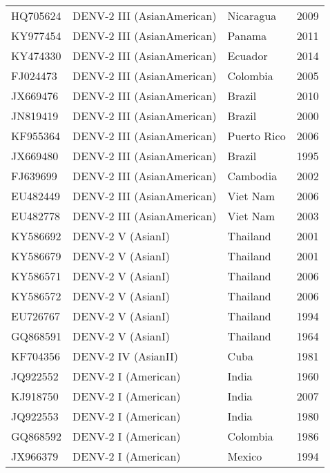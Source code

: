 \begin{scriptsize}
\begin{center}
\begin{longtable}{@{}lllc@{}}
HQ705624 & DENV-2 III (AsianAmerican) & Nicaragua    & 2009            \\
KY977454 & DENV-2 III (AsianAmerican) & Panama       & 2011            \\
KY474330 & DENV-2 III (AsianAmerican) & Ecuador      & 2014            \\
FJ024473 & DENV-2 III (AsianAmerican) & Colombia     & 2005            \\
JX669476 & DENV-2 III (AsianAmerican) & Brazil       & 2010            \\
JN819419 & DENV-2 III (AsianAmerican) & Brazil       & 2000            \\
KF955364 & DENV-2 III (AsianAmerican) & Puerto Rico  & 2006            \\
JX669480 & DENV-2 III (AsianAmerican) & Brazil       & 1995            \\
FJ639699 & DENV-2 III (AsianAmerican) & Cambodia     & 2002            \\
EU482449 & DENV-2 III (AsianAmerican) & Viet Nam     & 2006            \\
EU482778 & DENV-2 III (AsianAmerican) & Viet Nam     & 2003            \\
KY586692 & DENV-2 V (AsianI)          & Thailand     & 2001            \\
KY586679 & DENV-2 V (AsianI)          & Thailand     & 2001            \\
KY586571 & DENV-2 V (AsianI)          & Thailand     & 2006            \\
KY586572 & DENV-2 V (AsianI)          & Thailand     & 2006            \\
EU726767 & DENV-2 V (AsianI)          & Thailand     & 1994            \\
GQ868591 & DENV-2 V (AsianI)          & Thailand     & 1964            \\
KF704356 & DENV-2 IV (AsianII)        & Cuba         & 1981            \\
JQ922552 & DENV-2 I (American)        & India        & 1960            \\
KJ918750 & DENV-2 I (American)        & India        & 2007            \\
JQ922553 & DENV-2 I (American)        & India        & 1980            \\
GQ868592 & DENV-2 I (American)        & Colombia     & 1986            \\
JX966379 & DENV-2 I (American)        & Mexico       & 1994            \\

\end{longtable}
\end{center}
\end{scriptsize}
